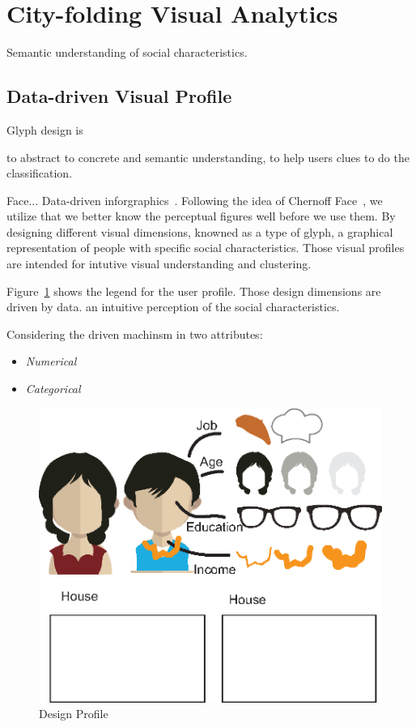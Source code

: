 
\section{City-folding Visual Analytics}

Semantic understanding of social characteristics.

\subsection{Data-driven Visual Profile}

Glyph design is 

to abstract to concrete and semantic understanding, to help users clues to do the classification. 

Face... Data-driven inforgraphics~\cite{}. Following the idea of Chernoff Face~\cite{1973}, we utilize that we better know the perceptual figures well before we use them. By designing different visual dimensions, knowned as a type of glyph, a graphical representation of people with specific social characteristics. Those visual profiles are intended for intutive visual understanding and clustering. 

Figure~\ref{fig:design_profile} shows the legend for the user profile. Those design dimensions are driven by data. an intuitive perception of the social characteristics. 

Considering the driven machinsm in two attributes: 
\begin{itemize}
\item \textit{Numerical}
\item \textit{Categorical}
\end{itemize}

\begin{figure}[htb!]
 \centering %
 \includegraphics[width=\columnwidth]{pictures/design_profile}
 \caption{Design Profile}
 \label{fig:design_profile}
\end{figure}

